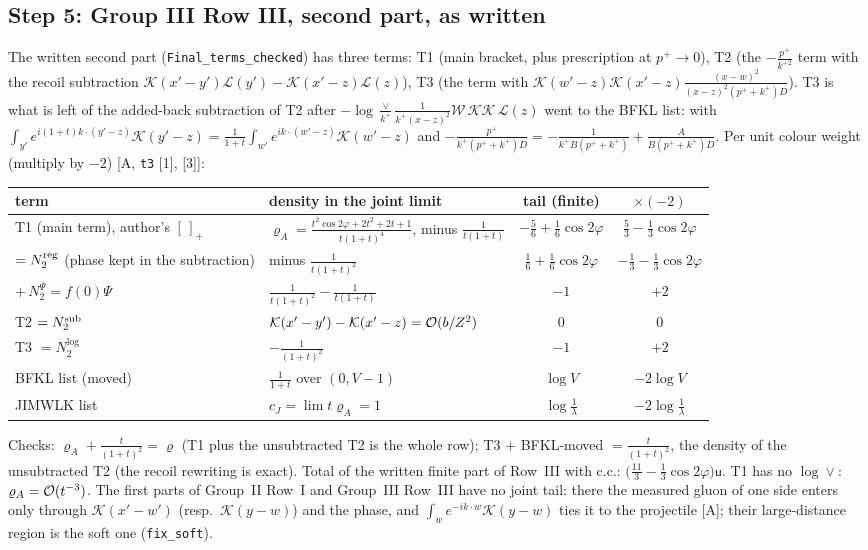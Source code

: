 \subsection{Step 5: Group III Row III, second part, as written}
\noindent The written second part (\texttt{Final\_terms\_checked}) has three terms: T1 (main bracket, plus prescription at $p^{+}\to0$), T2 (the $-\frac{p^{+}}{k^{+2}}$ term with the recoil subtraction $\mathcal{K}(x'-y')\mathcal{L}(y')-\mathcal{K}(x'-z)\mathcal{L}(z)$), T3 (the term with $\mathcal{K}(w'-z)\mathcal{K}(x'-z)\frac{(x-w)^{2}}{(x-z)^{2}(p^{+}+k^{+})D}$). T3 is what is left of the added-back subtraction of T2 after $-\log\frac{\vee}{k^{+}}\frac{1}{k^{+}(x-z)^{2}}\mathcal{W}\,\mathcal{K}\mathcal{K}\,\mathcal{L}(z)$ went to the BFKL list: with $\int_{y'}e^{i(1+t)k\cdot(y'-z)}\mathcal{K}(y'-z)=\frac{1}{1+t}\int_{w'}e^{ik\cdot(w'-z)}\mathcal{K}(w'-z)$ and $-\frac{p^{+}}{k^{+}(p^{+}+k^{+})D}=-\frac{1}{k^{+}B(p^{+}+k^{+})}+\frac{A}{B(p^{+}+k^{+})D}$. Per unit colour weight (multiply by $-2$) [A, \texttt{t3} [1], [3]]:
\begin{center}
\renewcommand{\arraystretch}{1.35}
\begin{tabular}{|l|l|c|c|}\hline
term & density in the joint limit & tail (finite) & $\times(-2)$\\\hline
T1 (main term), author's $[\,]_{+}$ & $\varrho_{A}=\frac{t^{2}\cos2\varphi+2t^{2}+2t+1}{t(1+t)^{4}}$, minus $\frac{1}{t(1+t)}$ & $-\frac56+\frac16\cos2\varphi$ & $\frac53-\frac13\cos2\varphi$\\
\quad $=N_{2}^{\rm reg}$ (phase kept in the subtraction) & minus $\frac{1}{t(1+t)^{2}}$ & $\frac16+\frac16\cos2\varphi$ & $-\frac13-\frac13\cos2\varphi$\\
\quad $+\,N_{2}^{\Psi}=f(0)\Psi$ & $\frac{1}{t(1+t)^{2}}-\frac{1}{t(1+t)}$ & $-1$ & $+2$\\
T2 $=N_{2}^{\rm sub}$ & $\mathcal{K}(x'-y')-\mathcal{K}(x'-z)={\cal O}(b/Z^{2})$ & $0$ & $0$\\
T3 $=N_{2}^{\log}$ & $-\frac{1}{(1+t)^{2}}$ & $-1$ & $+2$\\\hline
BFKL list (moved) & $\frac{1}{1+t}$ over $(0,V-1)$ & $\log V$ & $-2\log V$\\
JIMWLK list & $c_{J}=\lim t\varrho_{A}=1$ & $\log\frac1\lambda$ & $-2\log\frac1\lambda$\\\hline
\end{tabular}
\end{center}
Checks: $\varrho_{A}+\frac{t}{(1+t)^{2}}=\varrho$ (T1 plus the unsubtracted T2 is the whole row); T3 $+$ BFKL-moved $=\frac{t}{(1+t)^{2}}$, the density of the unsubtracted T2 (the recoil rewriting is exact). Total of the written finite part of Row~III with c.c.: $\big(\frac{11}{3}-\frac13\cos2\varphi\big)\mathsf{u}$. T1 has no $\log\vee$: $\varrho_{A}={\cal O}(t^{-3})$. The first parts of Group~II Row~I and Group~III Row~III have no joint tail: there the measured gluon of one side enters only through $\mathcal{K}(x'-w')$ (resp.\ $\mathcal{K}(y-w)$) and the phase, and $\int_{w}e^{-ik\cdot w}\mathcal{K}(y-w)$ ties it to the projectile [A]; their large-distance region is the soft one (\texttt{fix\_soft}).

